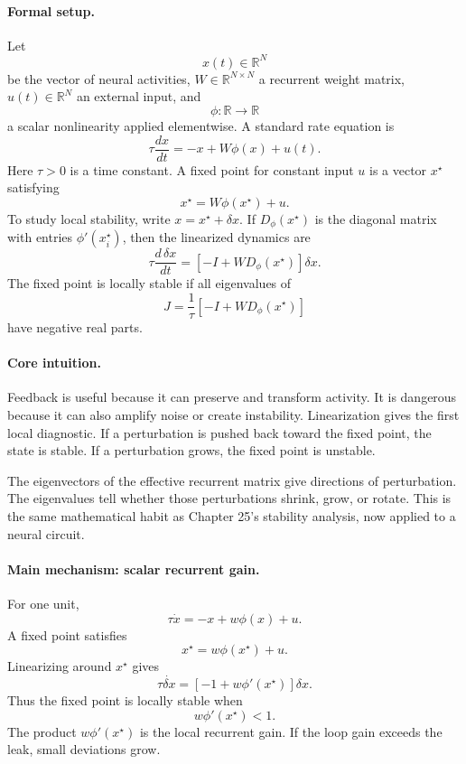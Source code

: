 \paragraph{Formal setup.}
Let
\[
x(t)\in\mathbb R^N
\]
be the vector of neural activities, \(W\in\mathbb R^{N\times N}\) a recurrent weight matrix, \(u(t)\in\mathbb R^N\) an external input, and
\[
\phi:\mathbb R\to\mathbb R
\]
a scalar nonlinearity applied elementwise. A standard rate equation is
\[
\boxed{
\tau \frac{dx}{dt}=-x+W\phi(x)+u(t).
}
\]
Here \(\tau>0\) is a time constant. A fixed point for constant input \(u\) is a vector \(x^\star\) satisfying
\[
\boxed{
x^\star=W\phi(x^\star)+u.
}
\]
To study local stability, write \(x=x^\star+\delta x\). If \(D_\phi(x^\star)\) is the diagonal matrix with entries \(\phi'(x_i^\star)\), then the linearized dynamics are
\[
\tau\frac{d\,\delta x}{dt}
=\left[-I+W D_\phi(x^\star)\right]\delta x.
\]
The fixed point is locally stable if all eigenvalues of
\[
J=\frac{1}{\tau}\left[-I+W D_\phi(x^\star)\right]
\]
have negative real parts.

\paragraph{Core intuition.}
Feedback is useful because it can preserve and transform activity. It is dangerous because it can also amplify noise or create instability. Linearization gives the first local diagnostic. If a perturbation is pushed back toward the fixed point, the state is stable. If a perturbation grows, the fixed point is unstable.

The eigenvectors of the effective recurrent matrix give directions of perturbation. The eigenvalues tell whether those perturbations shrink, grow, or rotate. This is the same mathematical habit as Chapter 25's stability analysis, now applied to a neural circuit.

\paragraph{Main mechanism: scalar recurrent gain.}
For one unit,
\[
\tau \dot x=-x+w\phi(x)+u.
\]
A fixed point satisfies
\[
x^\star=w\phi(x^\star)+u.
\]
Linearizing around \(x^\star\) gives
\[
\tau \dot{\delta x}
=\left[-1+w\phi'(x^\star)\right]\delta x.
\]
Thus the fixed point is locally stable when
\[
\boxed{
w\phi'(x^\star)<1.
}
\]
The product \(w\phi'(x^\star)\) is the local recurrent gain. If the loop gain exceeds the leak, small deviations grow.

